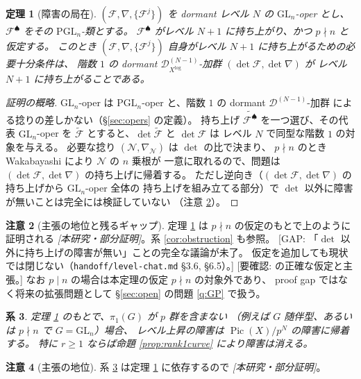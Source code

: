 \documentclass[a4paper,11pt]{ltjsarticle}
\theoremstyle{plain}
\newtheorem{theorem}{定理}[section]
\newtheorem{corollary}[theorem]{系}
\theoremstyle{definition}
\newtheorem{remark}[theorem]{注意}
\newcommand{\GAP}[1]{\textcolor{orange!85!black}{\textsf{[GAP: #1]}}}
\newcommand{\NeedsCheck}[1]{\textcolor{blue!70!black}{\textsf{[要確認: #1]}}}
\newcommand{\cD}{\mathcal{D}}
\newcommand{\cF}{\mathcal{F}}
\newcommand{\cN}{\mathcal{N}}
\newcommand{\Pic}{\operatorname{Pic}}
\newcommand{\Dlog}[1]{\cD^{(#1)}_{X^{\log}}}
\begin{document}
\begin{theorem}[障害の局在]\label{thm:det}
$(\cF,\nabla,\{\cF^j\})$ を dormant レベル $N$ の $\mathrm{GL}_n$-oper とし、
$\mathscr{F}^{\spadesuit}$ をその $\mathrm{PGL}_n$-類とする。
$\mathscr{F}^{\spadesuit}$ がレベル $N+1$ に持ち上がり、かつ $p\nmid n$ と仮定する。
このとき $(\cF,\nabla,\{\cF^j\})$ 自身がレベル $N+1$ に持ち上がるための必要十分条件は、
階数 $1$ の dormant $\Dlog{N-1}$-加群 $(\det\cF,\det\nabla)$ が
レベル $N+1$ に持ち上がることである。
\end{theorem}

\begin{proof}[証明の概略]
$\mathrm{GL}_n$-oper は $\mathrm{PGL}_n$-oper と、階数 $1$ の dormant $\cD^{(N-1)}$-加群
による捻りの差しかない（\S\ref{sec:opers} の定義）。
持ち上げ $\widetilde{\mathscr{F}^{\spadesuit}}$ を一つ選び、その代表 $\mathrm{GL}_n$-oper を
$\widetilde{\cF}$ とすると、$\det\widetilde{\cF}$ と $\det\cF$ は
レベル $N$ で同型な階数 $1$ の対象を与える。
必要な捻り $(\cN,\nabla_\cN)$ は $\det$ の比で決まり、
$p\nmid n$ のとき Wakabayashi \cite[Prop.~4.1.4]{Wak} により $\cN$ の $n$ 乗根が
一意に取れるので、問題は $(\det\cF,\det\nabla)$ の持ち上げに帰着する。
ただし逆向き（$(\det\cF,\det\nabla)$ の持ち上げから $\mathrm{GL}_n$-oper 全体の
持ち上げを組み立てる部分）で $\det$ 以外に障害が無いことは完全には検証していない
（注意 \ref{rem:det-status}）。
\end{proof}

\begin{remark}[主張の地位と残るギャップ]\label{rem:det-status}
定理 \ref{thm:det} は $p\nmid n$ の仮定のもとで上のように証明される
\emph{[本研究・部分証明]}。系 \ref{cor:obstruction} も参照。
\GAP{「$\det$ 以外に持ち上げの障害が無い」ことの完全な議論が未了。
仮定を追加しても現状では閉じない（\texttt{handoff/level-chat.md} \S3.6, \S6.5）。}
\NeedsCheck{\cite[Prop.~4.1.4]{Wak} の正確な仮定と主張。}
なお $p\mid n$ の場合は本定理の仮定 $p\nmid n$ の対象外であり、
proof gap ではなく将来の拡張問題として \S\ref{sec:open} の問題 \ref{q:GP} で扱う。
\end{remark}

\begin{corollary}\label{cor:pi1}
定理 \ref{thm:det} のもとで、$\pi_1(G)$ が $p$ 群を含まない
（例えば $G$ 随伴型、あるいは $p\nmid n$ で $G=\mathrm{GL}_n$）場合、
レベル上昇の障害は $\Pic(X)/p^N$ の障害に帰着する。
特に $r\ge1$ ならば命題 \ref{prop:rank1curve} により障害は消える。
\end{corollary}

\begin{remark}[主張の地位]\label{rem:pi1-status}
系 \ref{cor:pi1} は定理 \ref{thm:det} に依存するので \emph{[本研究・部分証明]}。
\end{remark}
\end{document}
